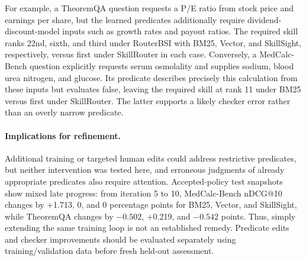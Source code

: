 For example, a TheoremQA question requests a P/E ratio from stock price and earnings per share, but the learned predicates additionally require dividend-discount-model inputs such as growth rates and payout ratios. The required skill ranks 22nd, sixth, and third under RouterBSI with BM25, Vector, and SkillSight, respectively, versus first under SkillRouter in each case. Conversely, a MedCalc-Bench question explicitly requests serum osmolality and supplies sodium, blood urea nitrogen, and glucose. Its predicate describes precisely this calculation from these inputs but evaluates false, leaving the required skill at rank 11 under BM25 versus first under SkillRouter. The latter supports a likely checker error rather than an overly narrow predicate.

\paragraph{Implications for refinement.}
Additional training or targeted human edits could address restrictive predicates, but neither intervention was tested here, and erroneous judgments of already appropriate predicates also require attention. Accepted-policy test snapshots show mixed late progress: from iteration 5 to 10, MedCalc-Bench nDCG@10 changes by +1.713, 0, and 0 percentage points for BM25, Vector, and SkillSight, while TheoremQA changes by $-0.502$, +0.219, and $-0.542$ points. Thus, simply extending the same training loop is not an established remedy. Predicate edits and checker improvements should be evaluated separately using training/validation data before fresh held-out assessment.
